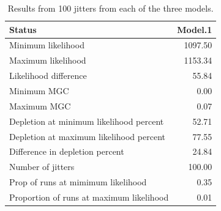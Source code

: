 \documentclass[12pt,]{article}
\begin{document}
\begin{table}[ht]
\centering
\caption{Results from 100 jitters from each of 
                                      the three models.} 
\label{tab:jitter}
\begin{tabular}{lr}
  \hline
Status & Model.1 \\ 
  \hline
Minimum likelihood & 1097.50 \\ 
  Maximum likelihood & 1153.34 \\ 
  Likelihood difference & 55.84 \\ 
  Minimum MGC & 0.00 \\ 
  Maximum MGC & 0.07 \\ 
  Depletion at minimum likelihood percent & 52.71 \\ 
  Depletion at maximum likelihood percent & 77.55 \\ 
  Difference in depletion percent & 24.84 \\ 
  Number of jitters & 100.00 \\ 
  Prop of runs at mimimum likelihood & 0.35 \\ 
  Proportion of runs at maximum likelihood & 0.01 \\ 
   \hline
\end{tabular}
\end{table}

\FloatBarrier

\newpage
\end{document}
